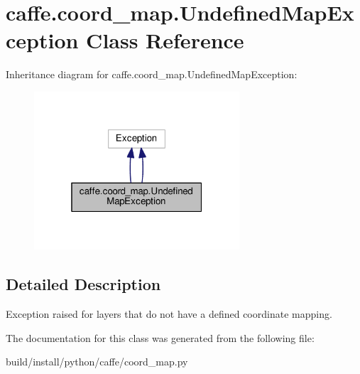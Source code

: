 \hypertarget{classcaffe_1_1coord__map_1_1_undefined_map_exception}{}\section{caffe.\+coord\+\_\+map.\+Undefined\+Map\+Exception Class Reference}
\label{classcaffe_1_1coord__map_1_1_undefined_map_exception}


Inheritance diagram for caffe.\+coord\+\_\+map.\+Undefined\+Map\+Exception\+:
\nopagebreak
\begin{figure}[H]
\begin{center}
\leavevmode
\includegraphics[width=217pt]{classcaffe_1_1coord__map_1_1_undefined_map_exception__inherit__graph}
\end{center}
\end{figure}


\subsection{Detailed Description}
\begin{DoxyVerb}Exception raised for layers that do not have a defined coordinate mapping.
\end{DoxyVerb}
 

The documentation for this class was generated from the following file\+:\begin{DoxyCompactItemize}
\item 
build/install/python/caffe/coord\+\_\+map.\+py\end{DoxyCompactItemize}
